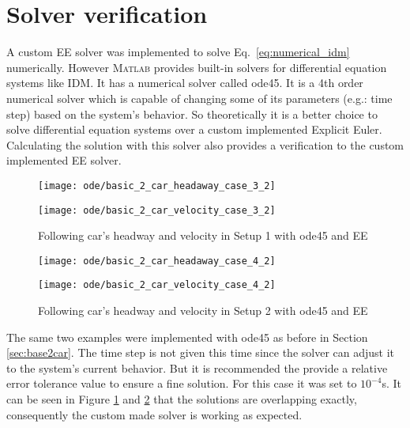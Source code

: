 	\section{Solver verification}
		A custom EE solver was implemented to solve Eq.~\eqref{eq:numerical_idm} numerically. However \textsc{Matlab} provides built-in solvers for differential equation systems like IDM. It has a numerical solver called ode45. It is a 4th order numerical solver which is capable of changing some of its parameters (e.g.: time step) based on the system's behavior. So theoretically it is a better choice to solve differential equation systems over a custom implemented Explicit Euler. Calculating the solution with this solver also provides a verification to the custom implemented EE solver. 
		\begin{figure}
			\centering
			\begin{minipage}{.5\textwidth}
				\centering
				\texttt{[image: ode/basic\_2\_car\_headaway\_case\_3\_2]}
			\end{minipage}\hfill
			\begin{minipage}{.5\textwidth}
				\centering
				\texttt{[image: ode/basic\_2\_car\_velocity\_case\_3\_2]}
			\end{minipage}
			\caption{Following car's headway and velocity in Setup 1 with ode45 and EE}
			\label{fig:basic2car_case_1_ode}
		\end{figure}
		\begin{figure}
			\centering
			\begin{minipage}{.5\textwidth}
				\centering
				\texttt{[image: ode/basic\_2\_car\_headaway\_case\_4\_2]}
			\end{minipage}\hfill
			\begin{minipage}{.5\textwidth}
				\centering
				\texttt{[image: ode/basic\_2\_car\_velocity\_case\_4\_2]}
			\end{minipage}
			\caption{Following car's headway and velocity in Setup 2 with ode45 and EE}
			\label{fig:basic2car_case_2_ode}
		\end{figure}

		The same two examples were implemented with ode45 as before in Section \ref{sec:base2car}. The time step is not given this time since the solver can adjust it to the system's current behavior. But it is recommended the provide a relative error tolerance value to ensure a fine solution. For this case it was set to $10^{-4}$s.
		It can be seen in Figure \ref{fig:basic2car_case_1_ode} and \ref{fig:basic2car_case_2_ode} that the solutions are overlapping exactly, consequently the custom made solver is working as expected.
